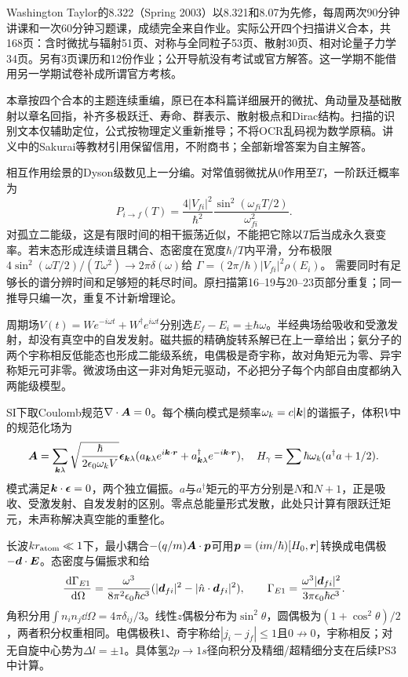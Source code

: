 \label{ch:graduate322}
Washington Taylor的8.322（Spring 2003）以8.321和8.07为先修，每周两次90分钟讲课和一次60分钟习题课，成绩完全来自作业。实际公开四个扫描讲义合本，共168页：含时微扰与辐射51页、对称与全同粒子53页、散射30页、相对论量子力学34页。另有3页课历和12份作业；公开导航没有考试或官方解答。这一学期不能借用另一学期试卷补成所谓官方考核。

本章按四个合本的主题连续重编，原已在本科篇详细展开的微扰、角动量及基础散射以章名回指，补齐多极跃迁、寿命、群表示、散射极点和Dirac结构。扫描的识别文本仅辅助定位，公式按物理定义重新推导；不将OCR乱码视为数学原稿。讲义中的Sakurai等教材引用保留信用，不附商书；全部新增答案为自主解答。

相互作用绘景的Dyson级数见上一分编。对常值弱微扰从0作用至$T$，一阶跃迁概率为
\[
 P_{i\to f}(T)=\frac{4|V_{fi}|^2}{\hbar^2}
 \frac{\sin^2(\omega_{fi}T/2)}{\omega_{fi}^2}.
\]
对孤立二能级，这是有限时间的相干振荡近似，不能把它除以$T$后当成永久衰变率。若末态形成连续谱且耦合、态密度在宽度$\hbar/T$内平滑，分布极限$4\sin^2(\omega T/2)/(T\omega^2)\to2\pi\delta(\omega)$给
$\Gamma=(2\pi/\hbar)|V_{fi}|^2\rho(E_i)$。
需要同时有足够长的谱分辨时间和足够短的耗尽时间。原扫描第16--19与20--23页部分重复；同一推导只编一次，重复不计新增理论。

周期场$V(t)=We^{-i\omega t}+W^\dagger e^{i\omega t}$分别选$E_f-E_i=\pm\hbar\omega$。半经典场给吸收和受激发射，却没有真空中的自发发射。磁共振的精确旋转系解已在上一章给出；氨分子的两个宇称相反低能态也形成二能级系统，电偶极是奇宇称，故对角矩元为零、异宇称矩元可非零。微波场由这一非对角矩元驱动，不必把分子每个内部自由度都纳入两能级模型。

SI下取Coulomb规范$\nabla\cdot\boldsymbol{A}=0$。每个横向模式是频率$\omega_k=c|\boldsymbol{k}|$的谐振子，体积$V$中的规范化场为
\[
 \boldsymbol{A}=\sum_{\boldsymbol{k}\lambda}\sqrt{\frac{\hbar}{2\epsilon_0\omega_kV}}
 \boldsymbol{\epsilon}_{\boldsymbol{k}\lambda}
 (a_{\boldsymbol{k}\lambda}e^{i\boldsymbol{k}\cdot\boldsymbol{r}}
 +a^\dagger_{\boldsymbol{k}\lambda}e^{-i\boldsymbol{k}\cdot\boldsymbol{r}}),\quad
 H_\gamma=\sum\hbar\omega_k(a^\dagger a+1/2).
\]
模式满足$\boldsymbol{k}\cdot\boldsymbol{\epsilon}=0$，两个独立偏振。$a$与$a^\dagger$矩元的平方分别是$N$和$N+1$，正是吸收、受激发射、自发发射的区别。零点总能量形式发散，此处只计算有限跃迁矩元，未声称解决真空能的重整化。

长波$kr_{\rm atom}\ll1$下，最小耦合$-(q/m)\boldsymbol{A}\cdot\boldsymbol{p}$可用$\boldsymbol{p}=(im/\hbar)[H_0,\boldsymbol{r}]$转换成电偶极$-\boldsymbol{d}\cdot\boldsymbol{E}$。态密度与偏振求和给
\[
 \frac{\,\mathrm d\Gamma_{E1}}{\,\mathrm d\Omega}
 =\frac{\omega^3}{8\pi^2\epsilon_0\hbar c^3}
 (|\boldsymbol{d}_{fi}|^2-|\hat n\cdot\boldsymbol{d}_{fi}|^2),\qquad
 \Gamma_{E1}=\frac{\omega^3|\boldsymbol{d}_{fi}|^2}{3\pi\epsilon_0\hbar c^3}.
\]
角积分用$\int n_in_j\dd\Omega=4\pi\delta_{ij}/3$。线性$z$偶极分布为$\sin^2\theta$，圆偶极为$(1+\cos^2\theta)/2$，两者积分权重相同。电偶极秩1、奇宇称给$|j_i-j_f|\le1$且$0\not\to0$，宇称相反；对无自旋中心势为$\Delta l=\pm1$。具体氢$2p\to1s$径向积分及精细/超精细分支在后续PS3中计算。


